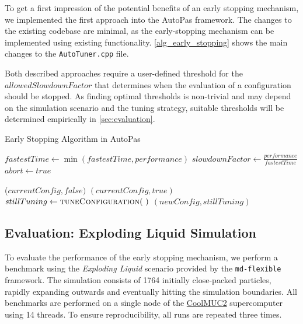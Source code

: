 \documentclass[conference]{IEEEtran}
\begin{document}
To get a first impression of the potential benefits of an early stopping mechanism, we implemented the first approach into the AutoPas framework. The changes to the existing codebase are minimal, as the early-stopping mechanism can be implemented using existing functionality. \autoref{alg_early_stopping} shows the main changes to the \texttt{AutoTuner.cpp} file.

Both described approaches require a user-defined threshold for the $allowedSlowdownFactor$ that determines when the evaluation of a configuration should be stopped. As finding optimal thresholds is non-trivial and may depend on the simulation scenario and the tuning strategy, suitable thresholds will be determined empirically in \autoref{sec:evaluation}.

\begin{algorithm}[h]
    \small
    \caption{Early Stopping Algorithm in AutoPas}
    \label{alg_early_stopping}
    \begin{algorithmic}[1]
        \State $fastestTime \gets \min(fastestTime, performance)$
        \State $slowdownFactor \gets \frac{performance}{fastestTime}$
        \State $abort \gets true$
        \EndIf
        \EndProcedure

        \vspace{0.5em}

        \State \Return ($currentConfig, false)$
            \State \Return $(currentConfig, true)$
            \Else
            \State $stillTuning \gets \Call{tuneConfiguration}{~}$
            \State \Return $(newConfig, stillTuning)$
        \EndIf
        \EndProcedure
    \end{algorithmic}
\end{algorithm}

\subsection{Evaluation: Exploding Liquid Simulation}
\label{sec:evaluation}

To evaluate the performance of the early stopping mechanism, we perform a benchmark using the \textit{Exploding Liquid} scenario provided by the \texttt{md-flexible} framework. The simulation consists of 1764 initially close-packed particles, rapidly expanding outwards and eventually hitting the simulation boundaries. All benchmarks are performed on a single node of the \href{https://doku.lrz.de/coolmuc-2-11484376.html}{CoolMUC2} supercomputer using 14 threads. To ensure reproducibility, all runs are repeated three times.
\end{document}
